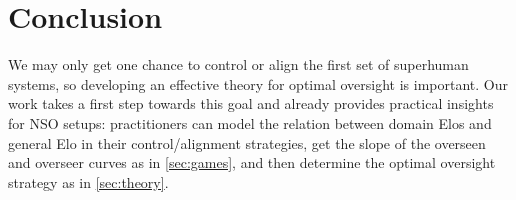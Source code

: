 \documentclass{article}
\begin{document}










\section{Conclusion}
\label{sec:conclusion}

We may only get one chance to control or align the first set of superhuman systems, so developing an effective theory for optimal oversight is important. Our work takes a first step towards this goal and already provides practical insights for NSO setups: practitioners can model the relation between domain Elos and general Elo in their control/alignment strategies, get the slope of the overseen and overseer curves as in \cref{sec:games}, and then determine the optimal oversight strategy as in \cref{sec:theory}. 
\end{document}
